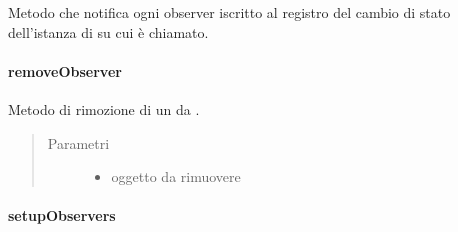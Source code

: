\documentclass[letterpaper,10pt,italian,openany,oneside]{sphinxmanual}
\begin{document}
\begin{fulllineitems}
\label{\detokenize{test/it/unicam/cs/pa/mastermind/gamecore/Observable:it.unicam.cs.pa.mastermind.gamecore.Observable.notifyObservers()}}
Metodo che notifica ogni observer iscritto al registro  del cambio di stato dell’istanza di  su cui è chiamato.

\end{fulllineitems}



\paragraph{removeObserver}
\label{\detokenize{test/it/unicam/cs/pa/mastermind/gamecore/Observable:removeobserver}}

\begin{fulllineitems}
\label{\detokenize{test/it/unicam/cs/pa/mastermind/gamecore/Observable:it.unicam.cs.pa.mastermind.gamecore.Observable.removeObserver(Observer)}}
Metodo di rimozione di un  da .
\begin{quote}\begin{description}
\item[{Parametri}] \leavevmode\begin{itemize}
\item {} 
 \textendash{} oggetto  da rimuovere

\end{itemize}

\end{description}\end{quote}

\end{fulllineitems}



\paragraph{setupObservers}
\label{\detokenize{test/it/unicam/cs/pa/mastermind/gamecore/Observable:setupobservers}}
\end{document}
